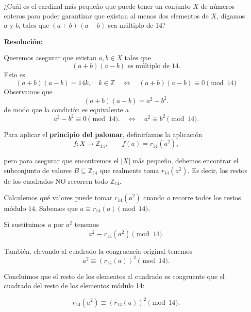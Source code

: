 \documentclass[a4paper,12pt]{article}
\begin{document}
\begin{ejercicio}[title=Ejercicio 41 (⋆)]
¿Cuál es el cardinal más pequeño que puede tener un conjunto $X$ de números enteros para poder garantizar que existan al menos dos elementos de $X$, digamos $a$ y $b$, tales que $(a + b)\,(a - b)$ sea múltiplo de 14?

\tcblower
\textbf{Resolución:}

Queremos asegurar que existan $a,b\in X$ tales que
\[
(a+b)(a-b)\text{ es múltiplo de }14.
\]
Esto es
\[
(a+b)(a-b) = 14k,\quad k \in \mathbb{Z} \quad \Longleftrightarrow \quad (a+b)(a-b) \equiv 0 \pmod{14}
\]
Observamos que
\[
(a+b)(a-b) = a^2 - b^2.
\]
de modo que la condición es equivalente a
\[
a^2 - b^2 \equiv 0 \pmod{14}. \quad \Longleftrightarrow \quad a^2 \equiv b^2 \pmod{14}.
\]

Para aplicar el \textbf{principio del palomar}, definiríamos la aplicación
\[
f:X\to \mathbb{Z}_{14}, \qquad f(a)= r_{14}(a^2),
\]

pero para asegurar que encontremos el $|X|$ más pequeño, debemos encontrar el subconjunto de valores $B \subseteq \mathbb{Z}_{14}$ que realmente toma $r_{14}(a^2)$. Es decir, los restos de los cuadrados NO recorren todo $\mathbb{Z}_{14}$.

\vspace{0.5em}

Calculemos qué valores puede tomar $r_{14}(a^2)$ cuando $a$ recorre todos los restos módulo $14$. Sabemos que $a\equiv r_{14}(a)\pmod{14}$.

Si sustituimos $a$ por $a^2$ tenemos
\[
a^2\equiv r_{14}(a^2)\pmod{14}.
\]

También, elevando al cuadrado la congruencia original tenemos
\[
a^2\equiv (r_{14}(a))^2 \pmod{14}.
\]

Concluimos que el resto de los elementos al cuadrado es congruente que el cuadrado del resto de los elementos módulo 14:

\[
r_{14}(a^2)\equiv (r_{14}(a))^2 \pmod{14}.
\]

\end{ejercicio}
\end{document}
